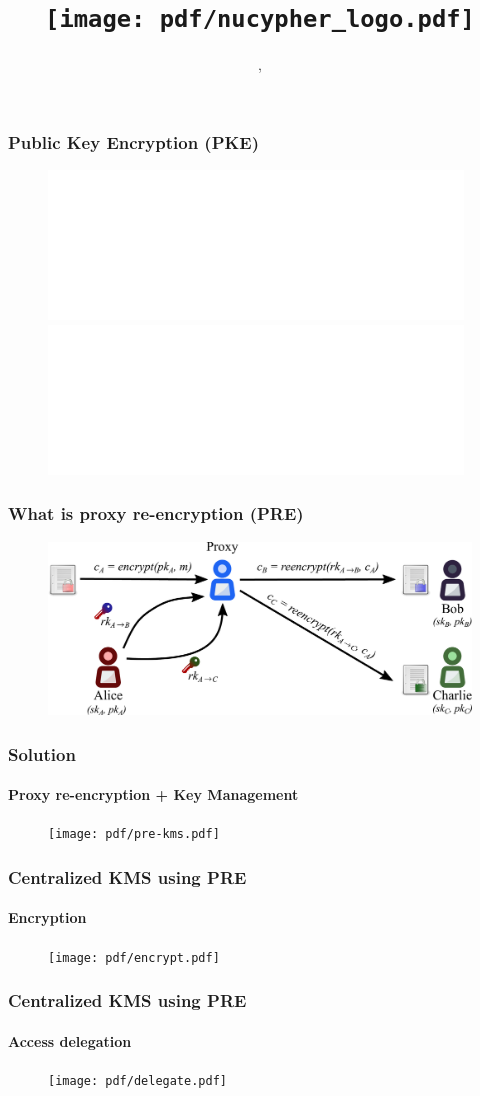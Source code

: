 \documentclass[xetex,mathsans,sans,aspectratio=169]{beamer}
\title[\titlefooter]{\texttt{[image: pdf/nucypher\_logo.pdf]}}
\author[\presenterfooter]{\presenter}
\date[\eventdate]{\event, \eventdate}
\begin{document}
    \begin{frame}
        \titlepage
    \end{frame}

    \begin{frame}
        \frametitle{Public Key Encryption (PKE)}
        \begin{figure}
            \centering
            \includegraphics<1>[width=11cm]{pdf/pke-multi.pdf}
            \includegraphics<2>[width=11cm]{pdf/pke-multi-hack.pdf}
        \end{figure}
    \end{frame}

    \begin{frame}
        \frametitle{What is proxy re-encryption (PRE)}
        \begin{figure}
            \centering
            \includegraphics[width=13cm]{pdf/pre-multi.pdf}
        \end{figure}
    \end{frame}

    \begin{frame}
        \frametitle{Solution}
        \framesubtitle{Proxy re-encryption + Key Management}
        \begin{figure}
            \centering
            \texttt{[image: pdf/pre-kms.pdf]}
        \end{figure}
    \end{frame}

    \begin{frame}
        \frametitle{Centralized KMS using PRE}
        \framesubtitle{Encryption}
        \begin{figure}
            \centering
            \texttt{[image: pdf/encrypt.pdf]}
        \end{figure}
    \end{frame}

    \begin{frame}
        \frametitle{Centralized KMS using PRE}
        \framesubtitle{Access delegation}
        \begin{figure}
            \centering
            \texttt{[image: pdf/delegate.pdf]}
        \end{figure}
    \end{frame}
\end{document}
